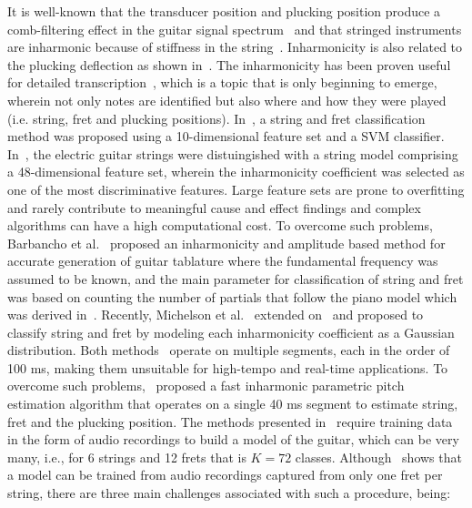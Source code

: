 \documentclass{article}
\begin{document}
\begin{sloppy}
It is well-known that the transducer position and plucking position produce a comb-filtering effect in the guitar signal spectrum~\cite{fletcher:physics_of_musical_instruments} and that stringed instruments are inharmonic because of stiffness in the string~\cite{fletcher:principles_of_vibration_and_sound}. Inharmonicity is also related to the plucking deflection as shown in~\cite{donkin:acoustics,rayleigh:sound,coltShank,rossing:science_of_string_instruments}. The inharmonicity has been proven useful for detailed transcription~\cite{barbancho:inharmonicity_tablature}, which is a topic that is only beginning to emerge, wherein not only notes are identified but also where and how they were played (i.e. string, fret and plucking positions). In~\cite{dittmar:realtime_string_detection}, a string and fret classification method was proposed using a 10-dimensional feature set and a SVM classifier. In~\cite{abesser:automatic_string_detection_ml}, the electric guitar strings were distuingished with a string model comprising a 48-dimensional feature set, wherein the inharmonicity coefficient was selected as one of the most discriminative features. Large feature sets are prone to overfitting and rarely contribute to meaningful cause and effect findings and complex algorithms can have a high computational cost. 
To overcome such problems, Barbancho et al.~\cite{barbancho:inharmonicity_tablature} proposed an inharmonicity and amplitude based method for accurate generation of guitar tablature where the fundamental frequency was assumed to be known, and the main parameter for classification of string and fret was based on counting the number of partials that follow the piano model which was derived in~\cite{fletcher:piano_model}. Recently, Michelson et al.~\cite{michelson2018_aes} extended on~\cite{barbancho:inharmonicity_tablature} and proposed to classify string and fret by modeling each inharmonicity coefficient as a Gaussian distribution. Both methods~\cite{barbancho:inharmonicity_tablature,michelson2018_aes} operate on multiple segments, each in the order of 100 ms, making them unsuitable for high-tempo and real-time applications. To overcome such problems,~\cite{hjerrild::icassp19} proposed a fast inharmonic parametric pitch estimation algorithm that operates on a single 40 ms segment to estimate string, fret and the plucking position. The methods presented in~\cite{barbancho:inharmonicity_tablature,michelson2018_aes,hjerrild::icassp19} require training data in the form of audio recordings to build a model of the guitar, which can be very many, i.e., for 6 strings and 12 frets that is $K=72$ classes. Although~\cite{hjerrild::icassp19,barbancho:inharmonicity_tablature} shows that a model can be trained from audio recordings captured from only one fret per string, there are three main challenges associated with such a procedure, being:

\end{sloppy}
\end{document}
